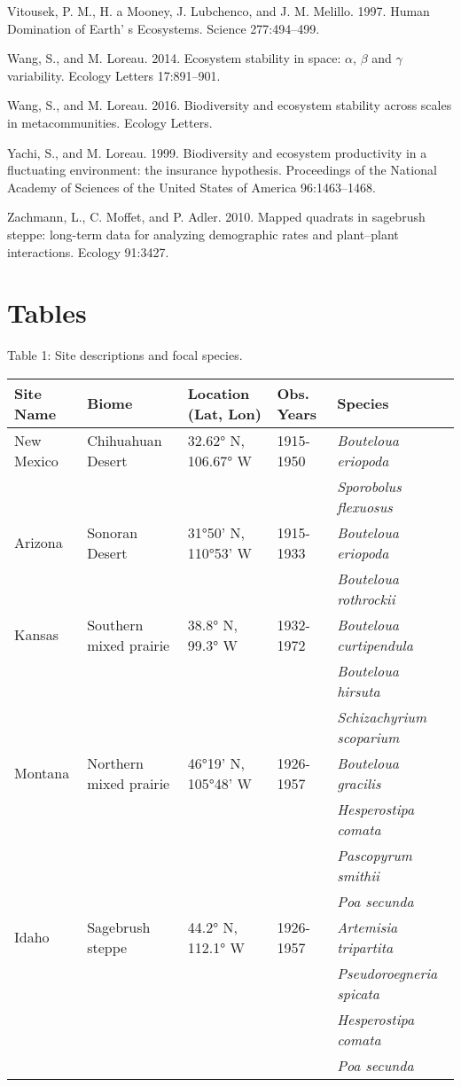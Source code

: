 \documentclass[12pt,]{article}
\begin{document}
Vitousek, P. M., H. a Mooney, J. Lubchenco, and J. M. Melillo. 1997.
Human Domination of Earth' s Ecosystems. Science 277:494--499.

Wang, S., and M. Loreau. 2014. Ecosystem stability in space: \(\alpha\),
\(\beta\) and \(\gamma\) variability. Ecology Letters 17:891--901.

Wang, S., and M. Loreau. 2016. Biodiversity and ecosystem stability
across scales in metacommunities. Ecology Letters.

Yachi, S., and M. Loreau. 1999. Biodiversity and ecosystem productivity
in a fluctuating environment: the insurance hypothesis. Proceedings of
the National Academy of Sciences of the United States of America
96:1463--1468.

Zachmann, L., C. Moffet, and P. Adler. 2010. Mapped quadrats in
sagebrush steppe: long-term data for analyzing demographic rates and
plant--plant interactions. Ecology 91:3427.

\newpage{}

\section{Tables}

\singlespacing

Table 1: Site descriptions and focal species. \footnotesize

\begin{longtable}[c]{@{}lllll@{}}
\toprule
Site Name & Biome & Location (Lat, Lon) & Obs. Years &
Species\tabularnewline
\midrule
\endhead
New Mexico & Chihuahuan Desert & 32.62° N, 106.67° W & 1915-1950 &
\emph{Bouteloua eriopoda}\tabularnewline
& & & & \emph{Sporobolus flexuosus}\tabularnewline
Arizona & Sonoran Desert & 31°50' N, 110°53' W & 1915-1933 &
\emph{Bouteloua eriopoda}\tabularnewline
& & & & \emph{Bouteloua rothrockii}\tabularnewline
Kansas & Southern mixed prairie & 38.8° N, 99.3° W & 1932-1972 &
\emph{Bouteloua curtipendula}\tabularnewline
& & & & \emph{Bouteloua hirsuta}\tabularnewline
& & & & \emph{Schizachyrium scoparium}\tabularnewline
Montana & Northern mixed prairie & 46°19' N, 105°48' W & 1926-1957 &
\emph{Bouteloua gracilis}\tabularnewline
& & & & \emph{Hesperostipa comata}\tabularnewline
& & & & \emph{Pascopyrum smithii}\tabularnewline
& & & & \emph{Poa secunda}\tabularnewline
Idaho & Sagebrush steppe & 44.2° N, 112.1° W & 1926-1957 &
\emph{Artemisia tripartita}\tabularnewline
& & & & \emph{Pseudoroegneria spicata}\tabularnewline
& & & & \emph{Hesperostipa comata}\tabularnewline
& & & & \emph{Poa secunda}\tabularnewline
\bottomrule
\end{longtable}
\end{document}
